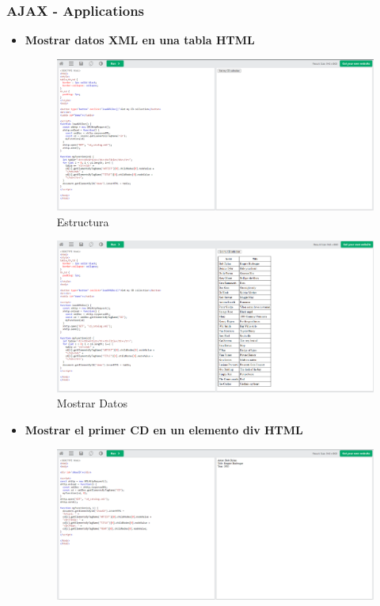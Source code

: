 \documentclass{article}
\begin{document}
	\subsubsection{AJAX - Applications}
	\begin{itemize}
		\item \textbf{Mostrar datos XML en una tabla HTML}
		\begin{figure}[H]
			\centering
			\includegraphics[width=1\textwidth,keepaspectratio]{img/ejemplo18.png}
			\caption{Estructura}
		\end{figure}
		\begin{figure}[H]
			\centering
			\includegraphics[width=1\textwidth,keepaspectratio]{img/boton18.png}
			\caption{Mostrar Datos}
		\end{figure}
		\newpage
		\item \textbf{Mostrar el primer CD en un elemento div HTML}
		\begin{figure}[H]
			\centering
			\includegraphics[width=1\textwidth,keepaspectratio]{img/ejemplo19.png}

\end{figure}
\end{itemize}
\end{document}
